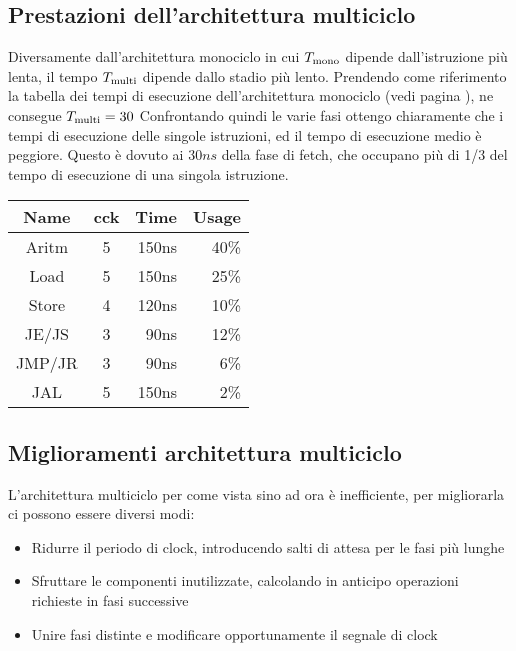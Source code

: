 \documentclass[../ace.tex]{subfiles}
\begin{document}
\subsection{Prestazioni dell'architettura multiciclo}
\begin{minipage}[t]{.66\textwidth}
    \vspace{0pt}
    Diversamente dall'architettura monociclo in cui $T_\text{mono}$ dipende dall'istruzione più lenta, il tempo $T_\text{multi}$ dipende dallo
    stadio più lento.
    Prendendo come riferimento la tabella dei tempi di esecuzione dell'architettura monociclo (vedi pagina
    \pageref{tab:tempi_esecuzione_monociclo}), ne consegue $T_\text{multi} =30$
    Confrontando quindi le varie fasi ottengo chiaramente che i tempi di esecuzione delle singole istruzioni, ed il tempo di
    esecuzione medio è peggiore. Questo è dovuto ai $30ns$ della fase di fetch, che occupano più di 1/3 del tempo di
    esecuzione di una singola istruzione.
\end{minipage}
\begin{minipage}[t]{.33\textwidth}
    \footnotesize
    \let\fs\tiny
    \vspace{-2em}
    \begin{center}
        \begin{tabu}{|c|c|r|r|}
            \hline
            \rowfont{\bfseries\centering}
            Name & cck & Time & Usage \\
            \hline
            \hline
            Aritm  & 5& 150ns &40\fs\%\\
            \hline
            Load & 5& 150ns   &25\fs\%\\
            \hline
            Store & 4& 120ns  &10\fs\%\\
            \hline
            JE/JS& 3& 90ns    &12\fs\%\\
            \hline
            JMP/JR& 3& 90ns   &6\fs\%\\
            \hline
            JAL& 5& 150ns     &2\fs\%\\
            \hline
        \end{tabu}
    \end{center}
\end{minipage}

\subsection{Miglioramenti architettura multiciclo}
L'architettura multiciclo per come vista sino ad ora è inefficiente, per migliorarla ci possono essere diversi modi:
\begin{itemize}
    \item Ridurre il periodo di clock, introducendo salti di attesa per le fasi più lunghe
    \item Sfruttare le componenti inutilizzate, calcolando in anticipo operazioni richieste in fasi successive
    \item Unire fasi distinte e modificare opportunamente il segnale di clock
\end{itemize}
\end{document}
